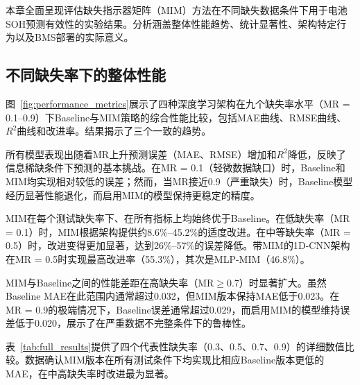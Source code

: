 \documentclass[10pt,a4paper]{ctexart}
\begin{document}
本章全面呈现评估缺失指示器矩阵（MIM）方法在不同缺失数据条件下用于电池SOH预测有效性的实验结果。分析涵盖整体性能趋势、统计显著性、架构特定行为以及BMS部署的实际意义。

\subsection{不同缺失率下的整体性能}\label{sec:overall}

图~\ref{fig:performance_metrics}展示了四种深度学习架构在九个缺失率水平（MR = 0.1--0.9）下Baseline与MIM策略的综合性能比较，包括MAE曲线、RMSE曲线、$R^2$曲线和改进率。结果揭示了三个一致的趋势。

所有模型表现出随着MR上升预测误差（MAE、RMSE）增加和$R^2$降低，反映了信息稀缺条件下预测的基本挑战。在MR = 0.1（轻微数据缺口）时，Baseline和MIM均实现相对较低的误差；然而，当MR接近0.9（严重缺失）时，Baseline模型经历显著性能退化，而启用MIM的模型保持更稳定的精度。

MIM在每个测试缺失率下、在所有指标上均始终优于Baseline。在低缺失率（MR = 0.1）时，MIM根据架构提供约8.6\%--45.2\%的适度改进。在中等缺失率（MR = 0.5）时，改进变得更加显著，达到26\%--57\%的误差降低。带MIM的1D-CNN架构在MR = 0.5时实现最高改进率（55.3\%），其次是MLP-MIM（46.8\%）。

MIM与Baseline之间的性能差距在高缺失率（MR$\geq$0.7）时显著扩大。虽然Baseline MAE在此范围内通常超过0.032，但MIM版本保持MAE低于0.023。在MR = 0.9的极端情况下，Baseline误差通常超过0.029，而启用MIM的模型维持误差低于0.020，展示了在严重数据不完整条件下的鲁棒性。

表~\ref{tab:full_results}提供了四个代表性缺失率（0.3、0.5、0.7、0.9）的详细数值比较。数据确认MIM版本在所有测试条件下均实现比相应Baseline版本更低的MAE，在中高缺失率时改进最为显著。
\end{document}
